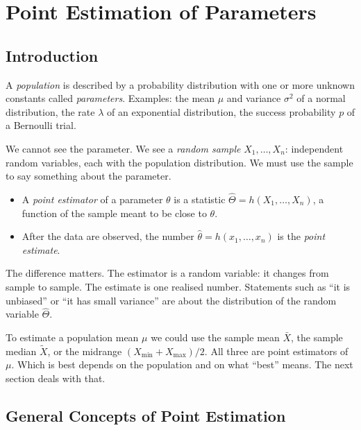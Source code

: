 \chapter{Point Estimation of Parameters}

\section{Introduction}

A \emph{population} is described by a probability distribution with one or more unknown constants called \emph{parameters}. Examples: the mean $\mu$ and variance $\sigma^2$ of a normal distribution, the rate $\lambda$ of an exponential distribution, the success probability $p$ of a Bernoulli trial.

We cannot see the parameter. We see a \emph{random sample} $X_1,\dots,X_n$: independent random variables, each with the population distribution. We must use the sample to say something about the parameter.

\begin{definition}
\begin{itemize}
  \item A \emph{point estimator} of a parameter $\theta$ is a statistic $\hat\Theta=h(X_1,\dots,X_n)$, a function of the sample meant to be close to $\theta$.
  \item After the data are observed, the number $\hat\theta=h(x_1,\dots,x_n)$ is the \emph{point estimate}.
\end{itemize}
\end{definition}

The difference matters. The estimator is a random variable: it changes from sample to sample. The estimate is one realised number. Statements such as ``it is unbiased'' or ``it has small variance'' are about the distribution of the random variable $\hat\Theta$.

\begin{example}
To estimate a population mean $\mu$ we could use the sample mean $\bar{X}$, the sample median $\tilde{X}$, or the midrange $(X_{\min}+X_{\max})/2$. All three are point estimators of $\mu$. Which is best depends on the population and on what ``best'' means. The next section deals with that.
\end{example}

\section{General Concepts of Point Estimation}

